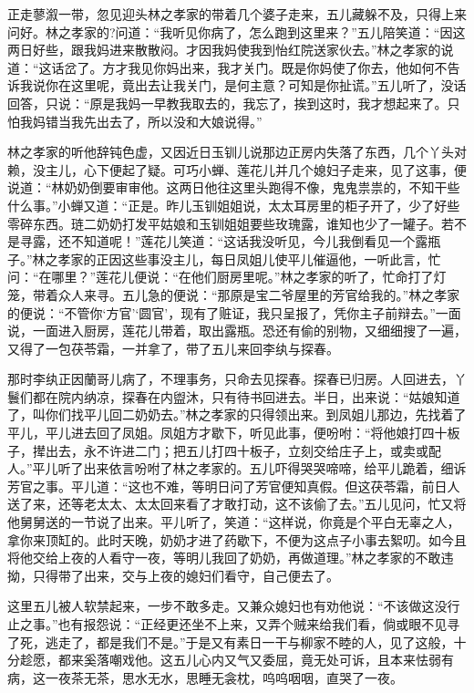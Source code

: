 \documentclass[12pt,oneside]{book}
\begin{document}
正走蓼溆一带，忽见迎头林之孝家的带着几个婆子走来，五儿藏躲不及，只得上来问好。林之孝家的?问道：“我听见你病了，怎么跑到这里来？”五儿陪笑道：“因这两日好些，跟我妈进来散散闷。才因我妈使我到怡红院送家伙去。”林之孝家的说道：“这话岔了。方才我见你妈出来，我才关门。既是你妈使了你去，他如何不告诉我说你在这里呢，竟出去让我关门，是何主意？可知是你扯谎。”五儿听了，没话回答，只说：“原是我妈一早教我取去的，我忘了，挨到这时，我才想起来了。只怕我妈错当我先出去了，所以没和大娘说得。”

林之孝家的听他辞钝色虚，又因近日玉钏儿说那边正房内失落了东西，几个丫头对赖，没主儿，心下便起了疑。可巧小蝉、莲花儿并几个媳妇子走来，见了这事，便说道：“林奶奶倒要审审他。这两日他往这里头跑得不像，鬼鬼祟祟的，不知干些什么事。”小蝉又道：“正是。昨儿玉钏姐姐说，太太耳房里的柜子开了，少了好些零碎东西。琏二奶奶打发平姑娘和玉钏姐姐要些玫瑰露，谁知也少了一罐子。若不是寻露，还不知道呢！”莲花儿笑道：“这话我没听见，今儿我倒看见一个露瓶子。”林之孝家的正因这些事没主儿，每日凤姐儿使平儿催逼他，一听此言，忙问：“在哪里？”莲花儿便说：“在他们厨房里呢。”林之孝家的听了，忙命打了灯笼，带着众人来寻。五儿急的便说：“那原是宝二爷屋里的芳官给我的。”林之孝家的便说：“不管你‘方官’‘圆官’，现有了赃证，我只呈报了，凭你主子前辩去。”一面说，一面进入厨房，莲花儿带着，取出露瓶。恐还有偷的别物，又细细搜了一遍，又得了一包茯苓霜，一并拿了，带了五儿来回李纨与探春。

那时李纨正因蘭哥儿病了，不理事务，只命去见探春。探春已归房。人回进去，丫鬟们都在院内纳凉，探春在内盥沐，只有待书回进去。半日，出来说：“姑娘知道了，叫你们找平儿回二奶奶去。”林之孝家的只得领出来。到凤姐儿那边，先找着了平儿，平儿进去回了凤姐。凤姐方才歇下，听见此事，便吩咐：“将他娘打四十板子，撵出去，永不许进二门；把五儿打四十板子，立刻交给庄子上，或卖或配人。”平儿听了出来依言吩咐了林之孝家的。五儿吓得哭哭啼啼，给平儿跪着，细诉芳官之事。平儿道：“这也不难，等明日问了芳官便知真假。但这茯苓霜，前日人送了来，还等老太太、太太回来看了才敢打动，这不该偷了去。”五儿见问，忙又将他舅舅送的一节说了出来。平儿听了，笑道：“这样说，你竟是个平白无辜之人，拿你来顶缸的。此时天晚，奶奶才进了药歇下，不便为这点子小事去絮叨。如今且将他交给上夜的人看守一夜，等明儿我回了奶奶，再做道理。”林之孝家的不敢违拗，只得带了出来，交与上夜的媳妇们看守，自己便去了。

这里五儿被人软禁起来，一步不敢多走。又兼众媳妇也有劝他说：“不该做这没行止之事。”也有报怨说：“正经更还坐不上来，又弄个贼来给我们看，倘或眼不见寻了死，逃走了，都是我们不是。”于是又有素日一干与柳家不睦的人，见了这般，十分趁愿，都来奚落嘲戏他。这五儿心内又气又委屈，竟无处可诉，且本来怯弱有病，这一夜茶无茶，思水无水，思睡无衾枕，呜呜咽咽，直哭了一夜。
\end{document}
